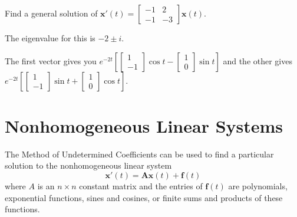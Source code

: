 \documentclass[../diffeq.tex]{subfiles}
\begin{document}
\pagebreak
\begin{example}
    Find a general solution of $\textbf{x}'(t)=\begin{bmatrix}
        -1 & 2\\
        -1 & -3
    \end{bmatrix}\textbf{x}(t)$.

    The eigenvalue for this is $-2\pm i$.

    The first vector gives you $e^{-2t}[\begin{bmatrix}
        1\\-1
    \end{bmatrix}\cos t - \begin{bmatrix}
        1\\0
    \end{bmatrix}\sin t]$ and the other gives $e^{-2t}[\begin{bmatrix}
        1\\-1
    \end{bmatrix}\sin t + \begin{bmatrix}
        1 \\ 0
    \end{bmatrix}\cos t]$.
\end{example}

\section{Nonhomogeneous Linear Systems}
The Method of Undetermined Coefficients can be used to find a particular solution to the nonhomogeneous linear system 
\[ \textbf{x}'(t)=\textbf{Ax}(t)+\textbf{f}(t) \]
where $A$ is an $n\times n$ constant matrix and the entries of $\textbf{f}(t)$ are polynomials, exponential functions, sines and cosines, or finite sums and products of these functions.
\end{document}
